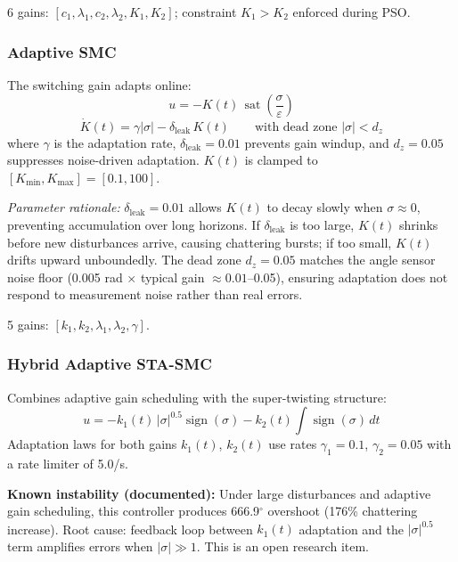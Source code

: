 \documentclass[11pt, a4paper]{article}
\newcommand{\sign}{\operatorname{sign}}
\newcommand{\sat}{\operatorname{sat}}
\begin{document}
6 gains: $[c_1, \lambda_1, c_2, \lambda_2, K_1, K_2]$;
constraint $K_1 > K_2$ enforced during PSO.

\subsubsection{Adaptive SMC}

The switching gain adapts online:
\begin{equation}
  u = -K(t)\,\sat\!\left(\frac{\sigma}{\varepsilon}\right)
  \label{eq:adaptive}
\end{equation}
\begin{equation}
  \dot{K}(t) = \gamma |\sigma| - \delta_\text{leak}\,K(t)
               \qquad\text{with dead zone }|\sigma| < d_z
  \label{eq:adaptive_law}
\end{equation}
where $\gamma$ is the adaptation rate, $\delta_\text{leak} = 0.01$ prevents
gain windup, and $d_z = 0.05$ suppresses noise-driven adaptation.
$K(t)$ is clamped to $[K_\text{min}, K_\text{max}] = [0.1, 100]$.

\textit{Parameter rationale:}
$\delta_\text{leak} = 0.01$ allows $K(t)$ to decay slowly when $\sigma \approx 0$,
preventing accumulation over long horizons. If $\delta_\text{leak}$ is too large,
$K(t)$ shrinks before new disturbances arrive, causing chattering bursts; if too
small, $K(t)$ drifts upward unboundedly. The dead zone $d_z = 0.05$ matches the
angle sensor noise floor (0.005 rad $\times$ typical gain $\approx 0.01$--0.05),
ensuring adaptation does not respond to measurement noise rather than real errors.

5 gains: $[k_1, k_2, \lambda_1, \lambda_2, \gamma]$.

\subsubsection{Hybrid Adaptive STA-SMC}

Combines adaptive gain scheduling with the super-twisting structure:
\begin{equation}
  u = -k_1(t)\,|\sigma|^{0.5}\sign(\sigma) - k_2(t)\int\sign(\sigma)\,dt
  \label{eq:hybrid}
\end{equation}
Adaptation laws for both gains $k_1(t)$, $k_2(t)$ use rates
$\gamma_1 = 0.1$, $\gamma_2 = 0.05$ with a rate limiter of 5.0/s.

\textbf{Known instability (documented):}
Under large disturbances and adaptive gain scheduling, this controller
produces 666.9$^\circ$ overshoot (176\% chattering increase).
Root cause: feedback loop between $k_1(t)$ adaptation and the
$|\sigma|^{0.5}$ term amplifies errors when $|\sigma| \gg 1$.
This is an open research item.
\end{document}
